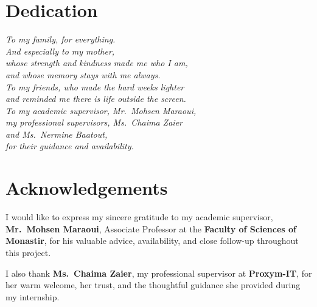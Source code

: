 \documentclass[12pt,a4paper]{report}
\begin{document}
\vspace*{\fill}
\clearpage


\chapter*{Dedication}
\thispagestyle{plain}

\begin{center}
\vspace*{3cm}
{
\itshape\large
To my family, for everything.\\[6pt]
And especially to my mother,\\
whose strength and kindness made me who I am,\\
and whose memory stays with me always.\\[18pt]
To my friends, who made the hard weeks lighter\\
and reminded me there is life outside the screen.\\[18pt]
To my academic supervisor, Mr.\ Mohsen Maraoui,\\
my professional supervisors, Ms.\ Chaima Zaier\\
and Ms.\ Nermine Baatout,\\
for their guidance and availability.
}

\end{center}

\chapter*{Acknowledgements}
\thispagestyle{plain}

I would like to express my sincere gratitude to my academic supervisor, \textbf{Mr.\ Mohsen Maraoui},
Associate Professor at the \textbf{Faculty of Sciences of Monastir}, for his valuable advice,
availability, and close follow-up throughout this project.

I also thank \textbf{Ms.\ Chaima Zaier}, my professional supervisor at \textbf{Proxym-IT}, for her warm
welcome, her trust, and the thoughtful guidance she provided during my internship.
\end{document}
